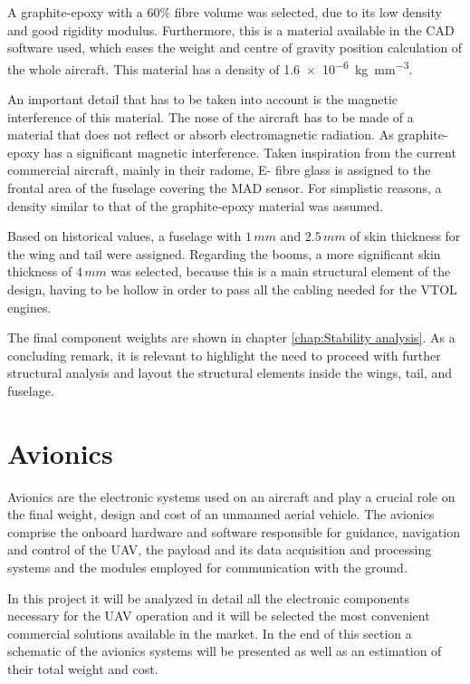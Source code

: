 \documentclass[english,fira]{ist-report}
\begin{document}
A graphite-epoxy with a $60\%$ fibre volume was selected, due to its low density and good rigidity modulus. Furthermore, this is a material available in the CAD software used, which eases the weight and centre of gravity position calculation of the whole aircraft. This material has a density of \SI{1.6e-6}{\kilogram\per\milli\meter\cubed}.

An important detail that has to be taken into account is the magnetic interference of this material. The nose of the aircraft has to be made of a material that does not reflect or absorb electromagnetic radiation. As graphite-epoxy has a significant magnetic interference. Taken inspiration from the current commercial aircraft, mainly in their radome,  E- fibre glass is assigned to the frontal area of the fuselage covering the MAD sensor. For simplistic reasons, a density similar to that of the graphite-epoxy material was assumed. 

Based on historical values, a fuselage with $1\,mm$ and $2.5\,mm$ of skin thickness for the wing and tail were assigned. Regarding the booms, a more significant skin thickness of $4\,mm$ was selected, because this is a main structural element of the design, having to be hollow in order to pass all the cabling needed for the VTOL engines.

The final component weights are shown in chapter \ref{chap:Stability analysis}. As a concluding remark, it is relevant to highlight the need to proceed with further structural analysis and layout the structural elements inside the wings, tail, and fuselage. 

\chapter{Avionics}

Avionics are the electronic systems used on an aircraft and play a crucial role on the final weight, design and cost of an unmanned aerial vehicle. The avionics comprise the onboard hardware and software responsible for guidance, navigation and control of the UAV, the payload and its data acquisition and processing systems and the modules employed for communication with the ground.

In this project it will be analyzed in detail all the electronic components necessary for the UAV operation and it will be selected the most convenient commercial solutions available in the market. In the end of this section a schematic of the avionics systems will be presented as well as an estimation of their total weight and cost.
\end{document}
